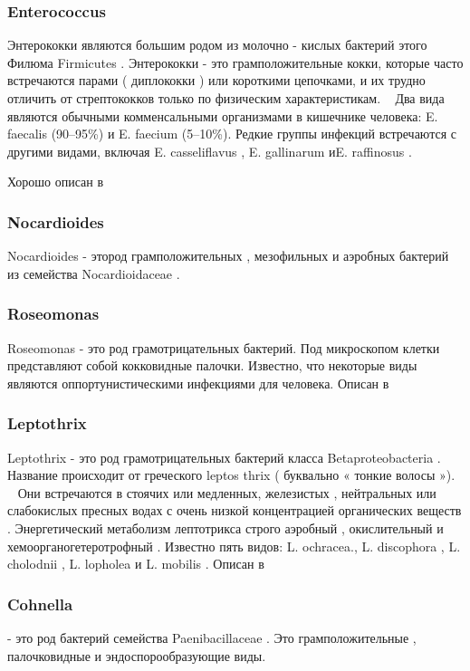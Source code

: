 \documentclass[11pt]{article}
\begin{document}
	\subsubsection{Enterococcus} 
	Энтерококки являются большим родом из молочно - кислых бактерий этого Филюма Firmicutes . Энтерококки - это грамположительные кокки, которые часто встречаются парами ( диплококки ) или короткими цепочками, и их трудно отличить от стрептококков только по физическим характеристикам. ~\cite{Enterococcus_4} Два вида являются обычными комменсальными организмами в кишечнике человека: E. faecalis (90–95\%) и E. faecium (5–10\%). Редкие группы инфекций встречаются с другими видами, включая E. casseliflavus , E. gallinarum иE. raffinosus . ~\cite{Enterococcus_4}
	
	Хорошо описан в ~\cite{Enterococcus_1}
	
	\subsubsection{Nocardioides}
	Nocardioides - этород грамположительных , мезофильных и аэробных бактерий из семейства Nocardioidaceae .~\cite{Nocardioides_1,Nocardioides_4,Nocardioides_5}
	
	\subsubsection{Roseomonas}
	Roseomonas - это род грамотрицательных бактерий. Под микроскопом клетки представляют собой кокковидные палочки. Известно, что некоторые виды являются оппортунистическими инфекциями для человека.
	Описан в ~\cite{Roseomonas_1, Roseomonas_2}
	
	\subsubsection{Leptothrix}
	Leptothrix - это род грамотрицательных бактерий класса Betaproteobacteria . ~\cite{Leptothrix_3} Название происходит от греческого leptos thrix ( буквально « тонкие волосы »). ~\cite{Leptothrix_1} Они встречаются в стоячих или медленных, железистых , нейтральных или слабокислых пресных водах с очень низкой концентрацией органических веществ . Энергетический метаболизм лептотрикса строго аэробный , окислительный и хемоорганогетеротрофный . Известно пять видов: L. ochracea., L. discophora , L. cholodnii , L. lopholea и L. mobilis .
	Описан в ~\cite{Leptothrix_1, Leptothrix_2, Leptothrix_3}
	
	\subsubsection{Cohnella}
	 - это род бактерий семейства Paenibacillaceae . Это грамположительные , палочковидные и эндоспорообразующие виды. ~\cite{Cohnella_1}
	
\end{document}
